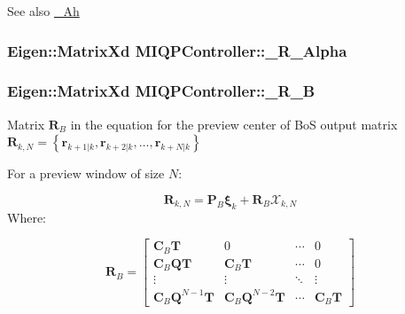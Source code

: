 \begin{DoxySeeAlso}{\-See also}
\hyperlink{classMIQPController_a388ed1c232c212e171276993b5cb3fec}{\-\_\-\-Ah} 
\end{DoxySeeAlso}
\hypertarget{classMIQPController_a700fa811c67f402f1027d4571051ba01}{
\subsubsection[{\-\_\-\-R\-\_\-\-Alpha}]{\setlength{\rightskip}{0pt plus 5cm}\-Eigen\-::\-Matrix\-Xd {\bf \-M\-I\-Q\-P\-Controller\-::\-\_\-\-R\-\_\-\-Alpha}}}\label{classMIQPController_a700fa811c67f402f1027d4571051ba01}
\hypertarget{classMIQPController_a69fbc25a2e2f2392fe0f92c5811c12dd}{
\subsubsection[{\-\_\-\-R\-\_\-\-B}]{\setlength{\rightskip}{0pt plus 5cm}\-Eigen\-::\-Matrix\-Xd {\bf \-M\-I\-Q\-P\-Controller\-::\-\_\-\-R\-\_\-\-B}}}\label{classMIQPController_a69fbc25a2e2f2392fe0f92c5811c12dd}
\-Matrix $\mathbf{R}_B$ in the equation for the preview center of \-Bo\-S output matrix $\mathbf{R}_{k,N} = \left\{ \mathbf{r}_{k+1|k}, \mathbf{r}_{k+2|k}, \dots, \mathbf{r}_{k+N|k} \right\}$

\-For a preview window of size $N$\-:

\[ \mathbf{R}_{k,N} = \mathbf{P}_B \mathbf{\xi}_k + \mathbf{R}_B \mathcal{X}_{k,N} \] \-Where\-:

\[ \mathbf{R}_B = \left[\begin{array}{cccc} \mathbf{C}_B\mathbf{T} & 0 & \cdots & 0 \\ \mathbf{C}_B\mathbf{Q}\mathbf{T} & \mathbf{C}_B\mathbf{T} & \cdots & 0 \\ \vdots & \vdots & \ddots & \vdots \\ \mathbf{C}_B\mathbf{Q}^{N-1}\mathbf{T} & \mathbf{C}_B\mathbf{Q}^{N-2}\mathbf{T} & \cdots & \mathbf{C}_B\mathbf{T} \end{array}\right] \]

